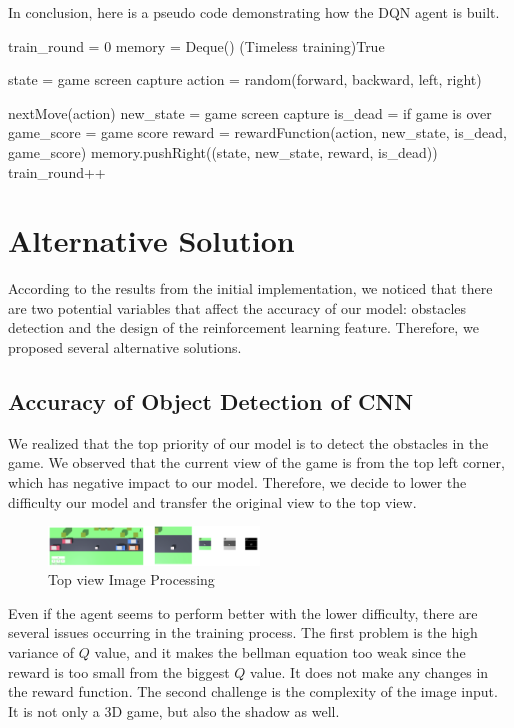 \documentclass{article}
\begin{document}
In conclusion, here is a pseudo code demonstrating how the DQN agent is built. 

\begin{algorithm}
train\_round = 0\;
memory = Deque()\;
\While(Timeless training){True} {
    state = game screen capture\;
     {
        action = random(forward, backward, left, right)\;
    }
    
    nextMove(action)\;
    new\_state = game screen capture\;
    is\_dead = if game is over\;
    game\_score = game score\;
    reward = rewardFunction(action, new\_state, is\_dead, game\_score)\;
    memory.pushRight((state, new\_state, reward, is\_dead))\;
    train\_round++\;
}
\end{algorithm}

\section{Alternative Solution}

According to the results from the initial implementation, we noticed that there are two potential variables that affect the accuracy of our model: obstacles detection and the design of the reinforcement learning feature. Therefore, we proposed several alternative solutions.

\subsection{Accuracy of Object Detection of CNN}
We realized that the top priority of our model is to detect the obstacles in the game. We observed that the current view of the game is from the top left corner, which has negative impact to our model. Therefore, we decide to lower the difficulty our model and transfer the original view to the top view. 

\begin{figure}[h]
    \caption{Top view Image Processing}
    \centering
    \includegraphics[width=0.5\textwidth]{topAngel.png}
\end{figure}

Even if the agent seems to perform better with the lower difficulty, there are several issues occurring in the training process. The first problem is the high variance of $Q$ value, and it makes the bellman equation too weak since the reward is too small from the biggest $Q$ value. It does not make any changes in the reward function. The second challenge is the complexity of the image input. It is not only a 3D game, but also the shadow as well. \par 
\end{document}
